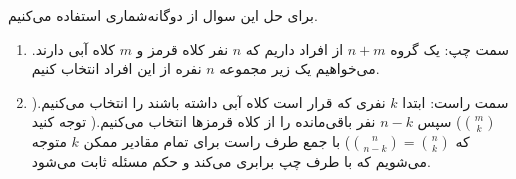 \p
برای حل این سوال از دوگانه‌شماری استفاده می‌کنیم.
\begin{enumerate}
    \item 
    سمت چپ: 
    \p
    یک گروه $n+m$ از افراد داریم که $n$ نفر کلاه قرمز و $m$ کلاه آبی دارند. می‌خواهیم یک زیر مجموعه $n$ نفره از این افراد انتخاب کنیم.

    \item 
    سمت راست:
    \p
    ابتدا $k$ نفری که قرار است کلاه آبی داشته باشند را انتخاب می‌کنیم.($\binom{m}{k}$)
    سپس $n-k$ نفر باقی‌مانده را از کلاه قرمزها انتخاب می‌کنیم.( توجه کنید که
    $ \binom{n}{n-k} = \binom{n}{k}$)
    با جمع طرف راست برای تمام مقادیر ممکن $k$ متوجه می‌شویم که با طرف چپ برابری می‌کند و حکم مسئله ثابت می‌شود.
\end{enumerate}